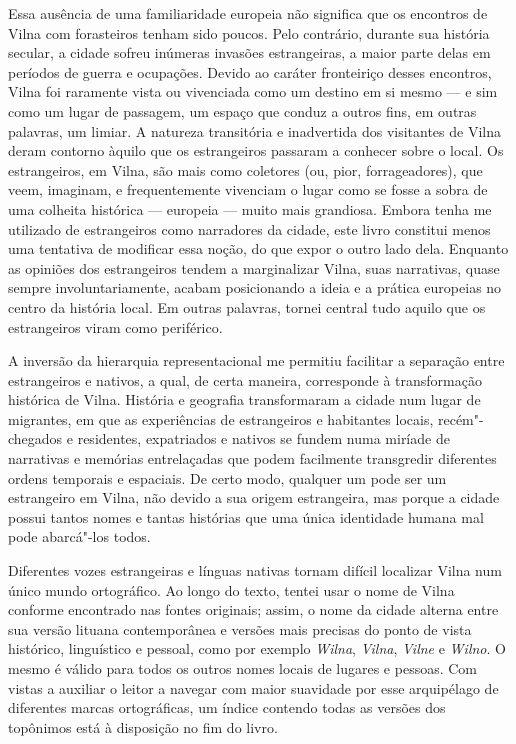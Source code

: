 Essa ausência de uma familiaridade europeia não significa que os
encontros de Vilna com forasteiros tenham sido poucos. Pelo contrário,
durante sua história secular, a cidade sofreu inúmeras invasões
estrangeiras, a maior parte delas em períodos de guerra e ocupações.
Devido ao caráter fronteiriço desses encontros, Vilna foi raramente
vista ou vivenciada como um destino em si mesmo --- e sim como um lugar de
passagem, um espaço que conduz a outros fins, em outras palavras, um
limiar. A natureza transitória e inadvertida dos visitantes de Vilna
deram contorno àquilo que os estrangeiros passaram a conhecer sobre o
local. Os estrangeiros, em Vilna, são mais como coletores (ou, pior,
forrageadores), que veem, imaginam, e frequentemente vivenciam o lugar
como se fosse a sobra de uma colheita histórica --- europeia --- muito mais
grandiosa. Embora tenha me utilizado de estrangeiros como narradores da
cidade, este livro constitui menos uma tentativa de modificar essa
noção, do que expor o outro lado dela. Enquanto as opiniões dos
estrangeiros tendem a marginalizar Vilna, suas narrativas, quase sempre
involuntariamente, acabam posicionando a ideia e a prática europeias no
centro da história local. Em outras palavras, tornei central tudo aquilo
que os estrangeiros viram como periférico.

A inversão da hierarquia representacional me permitiu facilitar a
separação entre estrangeiros e nativos, a qual, de certa maneira,
corresponde à transformação histórica de Vilna. História e geografia
transformaram a cidade num lugar de migrantes, em que as experiências de
estrangeiros e habitantes locais, recém"-chegados e residentes,
expatriados e nativos se fundem numa miríade de narrativas e memórias
entrelaçadas que podem facilmente transgredir diferentes ordens
temporais e espaciais. De certo modo, qualquer um pode ser um
estrangeiro em Vilna, não devido a sua origem estrangeira, mas porque a
cidade possui tantos nomes e tantas histórias que uma única identidade
humana mal pode abarcá"-los todos.

Diferentes vozes estrangeiras e línguas nativas tornam difícil localizar
Vilna num único mundo ortográfico. Ao longo do texto, tentei usar o nome
de Vilna conforme encontrado nas fontes originais; assim, o nome da
cidade alterna entre sua versão lituana contemporânea e versões mais
precisas do ponto de vista histórico, linguístico e pessoal, como por
exemplo \textit{Wilna}, \textit{Vilna}, \textit{Vilne} e \textit{Wilno}. O mesmo
é válido para todos os outros nomes locais de lugares e pessoas. Com
vistas a auxiliar o leitor a navegar com maior suavidade por esse
arquipélago de diferentes marcas ortográficas, um índice contendo todas
as versões dos topônimos está à disposição no fim do livro.


